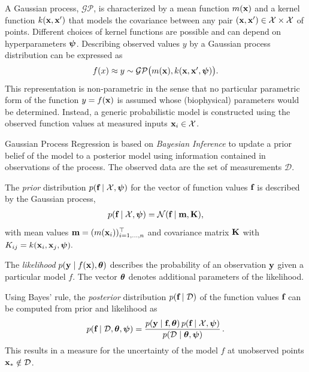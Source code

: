 A Gaussian process, $\mathcal{GP}$, is characterized by a mean function $m(\textbf{x})$ and a kernel function $k(\textbf{x},\textbf{x}')$ that models the covariance between any pair $(\textbf{x}, \textbf{x}') \in \mathcal{X} \times \mathcal{X}$ of points. Different choices of kernel functions are possible and can depend on hyperparameters $\boldsymbol{\psi}$. Describing observed values $y$ by a Gaussian process distribution can be expressed as
\begin{equation*}
  \begin{array}{lll}
    f(x) \approx y \sim \mathcal{GP}\big(m(\textbf{x}), k(\textbf{x},\textbf{x}',\boldsymbol{\psi})\big).
  \end{array}
\end{equation*}
This representation is non-parametric in the sense that no particular parametric form of the function $y=f(\textbf{x})$ is assumed whose (biophysical) parameters would be determined. Instead, a generic probabilistic model is constructed using the observed function values at measured inputs $\textbf{x}_i \in \mathcal{X}$.

Gaussian Process Regression is based on \emph{Bayesian Inference} to update a prior belief of the model to a posterior model using information contained in observations of the process.
The observed data are the set of measurements $\mathcal{D}$. 

The \emph{prior} distribution $p(\textbf{f}\mid\mathcal{X},\boldsymbol{\psi})$ for the vector of function values $\textbf{f}$ is described by the Gaussian process,
\begin{equation*}
  \begin{array}{lll}
    p(\textbf{f}\mid\mathcal{X},\boldsymbol{\psi}) = \mathcal{N}(\textbf{f}\mid\textbf{m},\textbf{K}),
  \end{array}
\end{equation*}
with mean values $\textbf{m} = (m(\textbf{x}_i))^\top_{i=1,\dots,n}$ and covariance matrix $\textbf{K}$ with $K_{ij} = k(\textbf{x}_i,\textbf{x}_j,\boldsymbol{\psi}).$

The \emph{likelihood} $p(\textbf{y}\mid f(\textbf{x}), \boldsymbol{\theta})$ describes the probability of an observation $\textbf{y}$ given a particular model $f$. The vector $\boldsymbol{\theta}$ denotes additional parameters of the likelihood. 

Using Bayes' rule, the \emph{posterior} distribution $p(\textbf{f}\mid\mathcal{D})$ of the function values $\textbf{f}$ can be computed from prior and likelihood as
\begin{equation*}
  \begin{array}{lll}
    p(\textbf{f}\mid\mathcal{D},\boldsymbol{\theta},\boldsymbol{\psi}) 
      = \displaystyle\frac{\displaystyle{p(\textbf{y}\mid\textbf{f},\boldsymbol{\theta})\,p(\textbf{f}\mid\mathcal{X},\boldsymbol{\psi})}}{\displaystyle{p(\mathcal{D}\mid\boldsymbol{\theta},\boldsymbol{\psi})}}\,.
  \end{array}
\end{equation*}
This results in a measure for the uncertainty of the model $f$ at unobserved points $\textbf{x}_\ast \notin \mathcal{D}$. 

